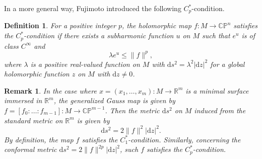 \documentclass[english, 12pt]{amsart}
\theoremstyle{plain}
\newtheorem{rem}[thm]{Remark}
\newtheorem{defi}[thm]{Definition}
\theoremstyle{remark}
\numberwithin{equation}{section}
\theoremstyle{plain}
\theoremstyle{named}
\begin{document}
In a more general way, Fujimoto \cite{Fujimoto83_1} introduced the following $C_p^*$-condition.
\begin{defi}
	For a positive integer $p$, the holomorphic map $f\colon M\rightarrow\mathbb{CP}^n$ satisfies the $C_p^*$-condition if there exists a subharmonic function $u$ on $M$ such that $e^u$ is of class $C^{\infty}$ and
	\[
	\lambda e^u\leq \|f\|^{p},
	\]
	where $\lambda$ is a positive real-valued function on $M$ with $\mathrm{d}s^2=\lambda^2|\mathrm{d}z|^2$ for a global holomorphic function $z$ on $M$ with $\mathrm{d}z\not=0$.
\end{defi}
\begin{rem}
	In the case where $x=(x_1,\dots,x_m)\colon M\rightarrow\mathbb{R}^m$ is a minimal surface immersed in $\mathbb{R}^m$, the generalized Gauss map is given by $f=[f_0:\dots:f_{m-1}]\colon M\to \mathbb{CP}^{m-1}$. Then the metric $\mathrm{d}s^2$ on $M$ induced from the standard metric on $\mathbb{R}^m$ is given by
	\[\mathrm{d}s^2=2\|f\|^2|\mathrm{d}z|^2.\]
	By definition, the map $f$ satisfies the $C_{1}^*$-condition. Similarly, concerning the conformal metric $\mathrm{d}s^2=2\|f\|^{2p}|\mathrm{d}z|^2$, such $f$ satisfies the $C_{p}^*$-condition.
\end{rem}
\end{document}
